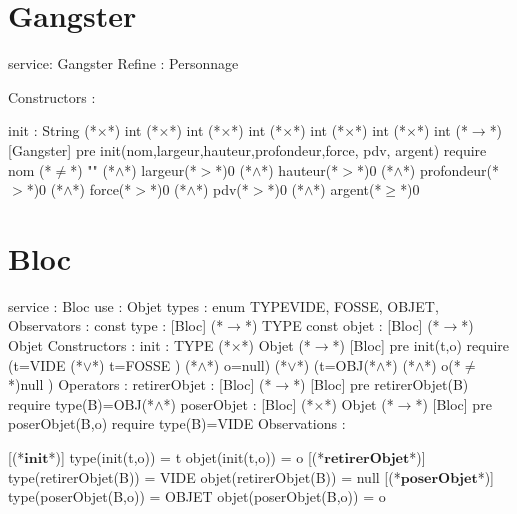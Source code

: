 \documentclass[a4paper, 11pt]{report}
\newcommand{\specB}[1]{\textbf{#1}}
\begin{document}
\section{Gangster}
\begin{Spe}
service: Gangster
Refine : Personnage

Constructors : 

	init : String (*$\times$*) int (*$\times$*) int (*$\times$*) int (*$\times$*) int (*$\times$*) int (*$\times$*) int (*$\rightarrow$*) [Gangster]
		pre init(nom,largeur,hauteur,profondeur,force, pdv, argent) require nom (*$\neq$*) "" (*$\land$*) largeur(*$>$*)0 (*$\land$*) hauteur(*$>$*)0 (*$\land$*) profondeur(*$>$*)0 (*$\land$*) force(*$>$*)0 (*$\land$*) pdv(*$>$*)0 (*$\land$*) argent(*$\ge$*)0 
 
\end{Spe}

\section{Bloc}
\begin{Spe}
service : Bloc
use : Objet
types : enum TYPE{VIDE, FOSSE, OBJET},
Observators :
      const type : [Bloc] (*$\rightarrow$*) TYPE
      const objet : [Bloc] (*$\rightarrow$*) Objet
Constructors :
      init : TYPE (*$\times$*) Objet (*$\rightarrow$*) [Bloc]
            pre init(t,o) require 
            (t=VIDE (*$\lor$*) t=FOSSE ) (*$\land$*) o=null) (*$\lor$*) (t=OBJ(*$\land$*) (*$\land$*) o(*$\ne$*)null ) 
Operators :
      retirerObjet : [Bloc] (*$\rightarrow$*) [Bloc]
            pre retirerObjet(B) require type(B)=OBJ(*$\land$*) 
      poserObjet : [Bloc] (*$\times$*) Objet (*$\rightarrow$*) [Bloc]
            pre poserObjet(B,o) require type(B)=VIDE 
Observations :
     
      [(*$\specB{init}$*)]
            type(init(t,o)) = t
            objet(init(t,o)) = o
      [(*$\specB{retirerObjet}$*)]
            type(retirerObjet(B)) = VIDE
            objet(retirerObjet(B)) = null
      [(*$\specB{poserObjet}$*)] 
            type(poserObjet(B,o)) = OBJET
            objet(poserObjet(B,o)) = o 
     
\end{Spe}
 
\end{document}
